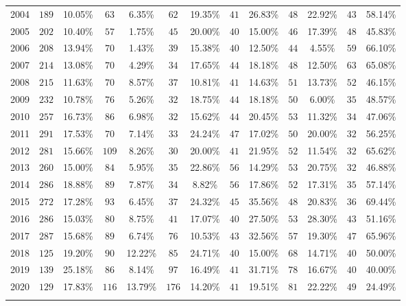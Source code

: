 \begin{table}[!htbp]
\begin{tabular}{@{\extracolsep{5pt}} ccccccccccccc}
2004 & $189$ & 10.05\% & $63$ & 6.35\% & $62$ & 19.35\% & $41$ & 26.83\% & $48$ & 22.92\% & $43$ & 58.14\% \\ 
2005 & $202$ & 10.40\% & $57$ & 1.75\% & $45$ & 20.00\% & $40$ & 15.00\% & $46$ & 17.39\% & $48$ & 45.83\% \\ 
2006 & $208$ & 13.94\% & $70$ & 1.43\% & $39$ & 15.38\% & $40$ & 12.50\% & $44$ & 4.55\% & $59$ & 66.10\% \\ 
2007 & $214$ & 13.08\% & $70$ & 4.29\% & $34$ & 17.65\% & $44$ & 18.18\% & $48$ & 12.50\% & $63$ & 65.08\% \\ 
2008 & $215$ & 11.63\% & $70$ & 8.57\% & $37$ & 10.81\% & $41$ & 14.63\% & $51$ & 13.73\% & $52$ & 46.15\% \\ 
2009 & $232$ & 10.78\% & $76$ & 5.26\% & $32$ & 18.75\% & $44$ & 18.18\% & $50$ & 6.00\% & $35$ & 48.57\% \\ 
2010 & $257$ & 16.73\% & $86$ & 6.98\% & $32$ & 15.62\% & $44$ & 20.45\% & $53$ & 11.32\% & $34$ & 47.06\% \\ 
2011 & $291$ & 17.53\% & $70$ & 7.14\% & $33$ & 24.24\% & $47$ & 17.02\% & $50$ & 20.00\% & $32$ & 56.25\% \\ 
2012 & $281$ & 15.66\% & $109$ & 8.26\% & $30$ & 20.00\% & $41$ & 21.95\% & $52$ & 11.54\% & $32$ & 65.62\% \\ 
2013 & $260$ & 15.00\% & $84$ & 5.95\% & $35$ & 22.86\% & $56$ & 14.29\% & $53$ & 20.75\% & $32$ & 46.88\% \\ 
2014 & $286$ & 18.88\% & $89$ & 7.87\% & $34$ & 8.82\% & $56$ & 17.86\% & $52$ & 17.31\% & $35$ & 57.14\% \\ 
2015 & $272$ & 17.28\% & $93$ & 6.45\% & $37$ & 24.32\% & $45$ & 35.56\% & $48$ & 20.83\% & $36$ & 69.44\% \\ 
2016 & $286$ & 15.03\% & $80$ & 8.75\% & $41$ & 17.07\% & $40$ & 27.50\% & $53$ & 28.30\% & $43$ & 51.16\% \\ 
2017 & $287$ & 15.68\% & $89$ & 6.74\% & $76$ & 10.53\% & $43$ & 32.56\% & $57$ & 19.30\% & $47$ & 65.96\% \\ 
2018 & $125$ & 19.20\% & $90$ & 12.22\% & $85$ & 24.71\% & $40$ & 15.00\% & $68$ & 14.71\% & $40$ & 50.00\% \\ 
2019 & $139$ & 25.18\% & $86$ & 8.14\% & $97$ & 16.49\% & $41$ & 31.71\% & $78$ & 16.67\% & $40$ & 40.00\% \\ 
2020 & $129$ & 17.83\% & $116$ & 13.79\% & $176$ & 14.20\% & $41$ & 19.51\% & $81$ & 22.22\% & $49$ & 24.49\% \\ 
\hline \\[-1.8ex] 
\end{tabular} 
\end{table} 
